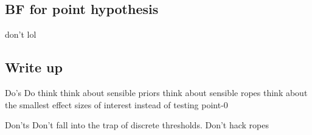 \documentclass[
  doc,
  longtable,
  nolmodern,
  notxfonts,
  notimes,
  colorlinks=true,linkcolor=blue,citecolor=blue,urlcolor=blue]{apa7}
\begin{document}
\subsection{BF for point hypothesis}\label{bf-for-point-hypothesis}

don't lol

\subsection{Write up}\label{write-up}

Do's Do think think about sensible priors think about sensible ropes
think about the smallest effect sizes of interest instead of testing
point-0

Don'ts Don't fall into the trap of discrete thresholds. Don't hack ropes
\end{document}
